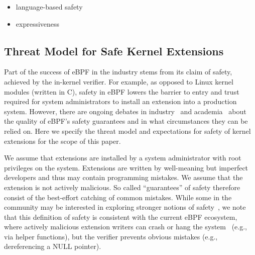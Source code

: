 \begin{itemize}
    \item language-based safety
    \item expressiveness
\end{itemize}
%


\subsection{Threat Model for Safe Kernel Extensions}
Part of the success of eBPF in the industry stems from its claim of
safety, achieved by the in-kernel verifier.  For example, as opposed
to Linux kernel modules (written in C), safety in eBPF lowers the
barrier to entry and trust required for system administrators to
install an extension into a production system.  However, there are
ongoing debates in industry~\cite{unprivileged-ebpf} and
academia~\cite{hotos-untenable} about the quality of eBPF's safety
guarantees and in what circumstances they can be relied on.  Here we
specify the threat model and expectations for safety of kernel
extensions for the scope of this paper.

We assume that extensions are installed by a system administrator with
root privileges on the system.  Extensions are written by well-meaning
but imperfect developers and thus may contain programming mistakes.
We assume that the extension is not actively malicious.  So called
``guarantees'' of safety therefore consist of the best-effort catching
of common mistakes.  While some in the community may be interested in
exploring stronger notions of
safety~\cite{unprivileged-ebpf,seccomp-ebpf}, we note that this
definition of safety is consistent with the current eBPF ecosystem,
where actively malicious extension writers can crash or hang the
system~\cite{hotos-untenable,ebpf-runtime,ebpf-stack} (e.g., via
helper functions), but the verifier prevents obvious mistakes (e.g.,
dereferencing a NULL pointer).




